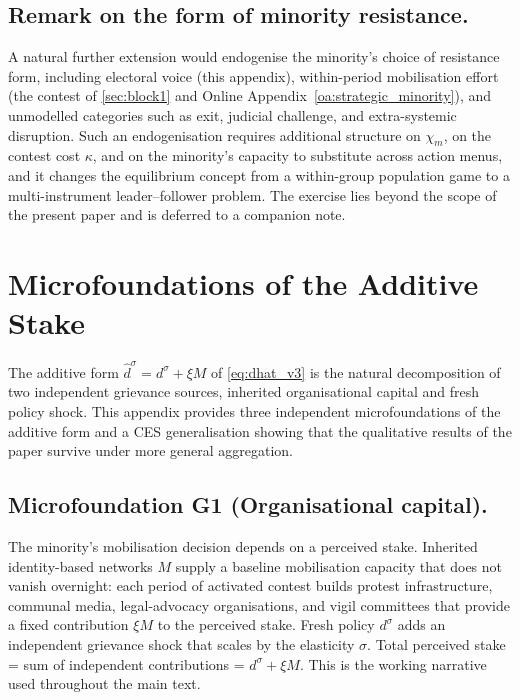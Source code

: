 \documentclass[11pt,twoside]{extarticle}
\begin{document}
\subsection*{Remark on the form of minority resistance.} A natural further extension would endogenise the minority's choice of resistance form, including electoral voice (this appendix), within-period mobilisation effort (the contest of \autoref{sec:block1} and Online Appendix~\ref{oa:strategic_minority}), and unmodelled categories such as exit, judicial challenge, and extra-systemic disruption. Such an endogenisation requires additional structure on $\chi_m$, on the contest cost $\kappa$, and on the minority's capacity to substitute across action menus, and it changes the equilibrium concept from a within-group population game to a multi-instrument leader--follower problem. The exercise lies beyond the scope of the present paper and is deferred to a companion note.


\section{Microfoundations of the Additive Stake}\label{oa:stake_micro}

The additive form $\hat d^\sigma=d^\sigma+\xi M$ of \eqref{eq:dhat_v3} is the natural decomposition of two independent grievance sources, inherited organisational capital and fresh policy shock. This appendix provides three independent microfoundations of the additive form and a CES generalisation showing that the qualitative results of the paper survive under more general aggregation.

\subsection*{Microfoundation G1 (Organisational capital).} The minority's mobilisation decision depends on a perceived stake. Inherited identity-based networks $M$ supply a baseline mobilisation capacity that does not vanish overnight: each period of activated contest builds protest infrastructure, communal media, legal-advocacy organisations, and vigil committees that provide a fixed contribution $\xi M$ to the perceived stake. Fresh policy $d^\sigma$ adds an independent grievance shock that scales by the elasticity $\sigma$. Total perceived stake = sum of independent contributions = $d^\sigma+\xi M$. This is the working narrative used throughout the main text.
\end{document}
